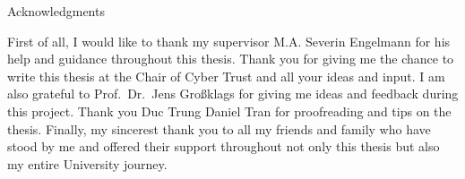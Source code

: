 \thispagestyle{empty}

\vspace*{20mm}

\begin{center}
	{ Acknowledgments}
\end{center}

\vspace{10mm}

First of all, I would like to thank my supervisor M.A. Severin Engelmann for his help
and guidance throughout this thesis. Thank you for giving me the chance to write
this thesis at the Chair of Cyber Trust and all your ideas and input. I am also
grateful to Prof.\ Dr.\ Jens Großklags for giving me ideas and feedback during this
project. Thank you Duc Trung Daniel Tran for proofreading and tips on the thesis.
Finally, my sincerest thank you to all my friends and family who have stood by me
and offered their support throughout not only this thesis but also my entire
University journey.

\cleardoublepage{}
